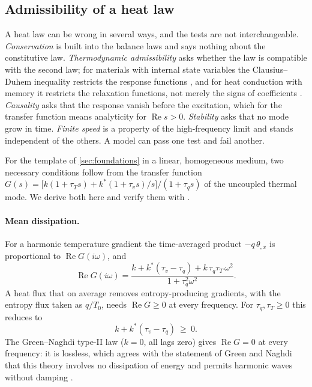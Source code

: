 \subsection{Admissibility of a heat law}\label{sec:admiss}
A heat law can be wrong in several ways, and the tests are not interchangeable. \emph{Conservation} is built into the balance laws and says nothing about the constitutive law. \emph{Thermodynamic admissibility} asks whether the law is compatible with the second law; for materials with internal state variables the Clausius--Duhem inequality restricts the response functions \citep{ColemanGurtin1967}, and for heat conduction with memory it restricts the relaxation functions, not merely the signs of coefficients \citep{ChenNunziato1974}. \emph{Causality} asks that the response vanish before the excitation, which for the transfer function means analyticity for $\operatorname{Re}s>0$. \emph{Stability} asks that no mode grow in time. \emph{Finite speed} is a property of the high-frequency limit and stands independent of the others. A model can pass one test and fail another.

For the template of \cref{sec:foundations} in a linear, homogeneous medium, two necessary conditions follow from the transfer function $G(s)=\bigl[k(1+\tau_Ts)+k^*(1+\tau_vs)/s\bigr]/(1+\tau_qs)$ of the uncoupled thermal mode. We derive both here and verify them with .

\paragraph{Mean dissipation.} For a harmonic temperature gradient the time-averaged product $-q\,\theta_{,x}$ is proportional to $\operatorname{Re}G(i\omega)$, and
\begin{equation}\label{eq:reG}
\operatorname{Re}G(i\omega)=\frac{k+k^*(\tau_v-\tau_q)+k\,\tau_q\tau_T\,\omega^2}{1+\tau_q^2\omega^2}.
\end{equation}
A heat flux that on average removes entropy-producing gradients, with the entropy flux taken as $q/T_0$, needs $\operatorname{Re}G\ge0$ at every frequency. For $\tau_q,\tau_T\ge0$ this reduces to
\begin{equation}\label{eq:admiss}
k+k^*(\tau_v-\tau_q)\ \ge\ 0 .
\end{equation}
The Green--Naghdi type-II law ($k=0$, all lags zero) gives $\operatorname{Re}G=0$ at every frequency: it is lossless, which agrees with the statement of Green and Naghdi that this theory involves no dissipation of energy and permits harmonic waves without damping \citep{Green1993}.

